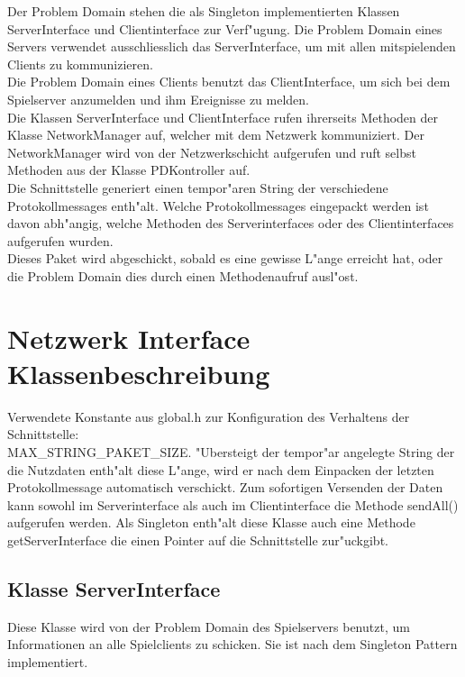 Der Problem Domain stehen die als Singleton implementierten Klassen ServerInterface
und Clientinterface zur Verf"ugung. Die Problem Domain eines Servers verwendet ausschliesslich
das ServerInterface, um mit allen mitspielenden Clients zu kommunizieren. \\
Die Problem Domain eines Clients benutzt das ClientInterface, um sich bei dem Spielserver
anzumelden und ihm Ereignisse zu melden.\\
Die Klassen ServerInterface und ClientInterface rufen ihrerseits Methoden 
der Klasse NetworkManager auf, welcher mit dem Netzwerk kommuniziert. 
Der NetworkManager wird von der Netzwerkschicht aufgerufen und ruft selbst Methoden aus
der Klasse PDKontroller auf.\\
Die Schnittstelle generiert einen tempor"aren String der verschiedene Protokollmessages 
enth"alt. Welche Protokollmessages eingepackt werden ist davon abh"angig, welche Methoden
des Serverinterfaces oder des Clientinterfaces aufgerufen wurden.\\
Dieses Paket wird abgeschickt, sobald es eine gewisse L"ange erreicht hat, oder die Problem Domain
dies durch einen Methodenaufruf ausl"ost.

\section{Netzwerk Interface Klassenbeschreibung}

Verwendete Konstante aus global.h zur Konfiguration des Verhaltens der Schnittstelle:
\\MAX\_STRING\_PAKET\_SIZE. "Ubersteigt der tempor"ar angelegte String der die Nutzdaten 
enth"alt diese L"ange, wird er nach dem Einpacken der letzten Protokollmessage automatisch
verschickt. Zum sofortigen Versenden der Daten kann sowohl im Serverinterface als auch im
Clientinterface die Methode sendAll() aufgerufen werden.
Als Singleton enth"alt diese Klasse auch eine Methode getServerInterface die einen Pointer
auf die Schnittstelle zur"uckgibt.

\subsection{Klasse ServerInterface}
Diese Klasse wird von der Problem Domain des Spielservers benutzt, um Informationen an alle
Spielclients zu schicken. 
Sie ist nach dem Singleton Pattern implementiert.

